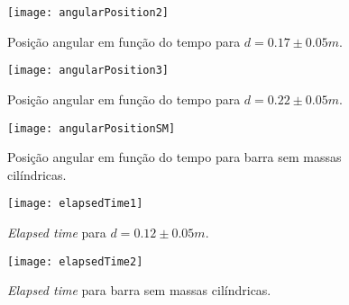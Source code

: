 \documentclass[11pt]{report}
\begin{document}
\begin{figure} [H]
\center
\texttt{[image: angularPosition2]}
\caption{Posição angular em função do tempo para $d=0.17\pm0.05 m $.}
\end{figure}
\begin{figure} [H]
\center
\texttt{[image: angularPosition3]}
\caption{Posição angular em função do tempo para $d=0.22\pm0.05 m $.}
\end{figure}
\begin{figure} [H]
\center
\texttt{[image: angularPositionSM]}
\caption{Posição angular em função do tempo para barra sem massas cilíndricas.}
\end{figure}

\begin{figure} [H]
\center
\texttt{[image: elapsedTime1]}
\caption{\textit{Elapsed time} para $d=0.12\pm0.05 m $.}
\end{figure}

\begin{figure} [H]
\center
\texttt{[image: elapsedTime2]}
\caption{\textit{Elapsed time} para barra sem massas cilíndricas.}
\end{figure}
\end{document}
